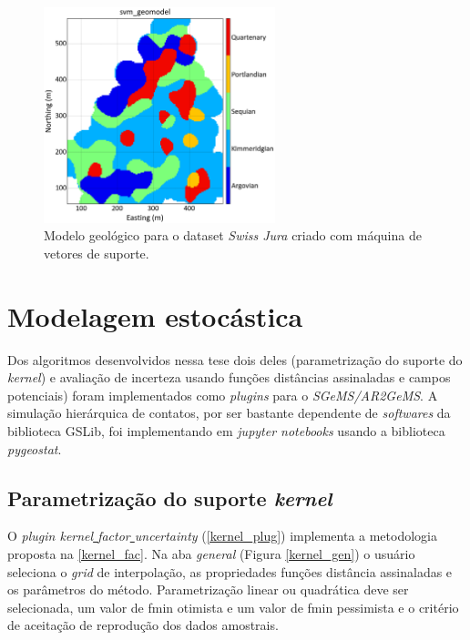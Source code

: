 \begin{figure}[H]
	\centering
	\caption{\label{jura_svm}Modelo geológico para o dataset \textit{Swiss Jura} criado com máquina de vetores de suporte.}
	\includegraphics[width=0.6\textwidth]{apendice/imagens/svmgeomodel.png}
\end{figure}

\section{Modelagem estocástica}

Dos algoritmos desenvolvidos nessa tese dois deles (parametrização do suporte do \textit{kernel}) e avaliação de incerteza usando funções distâncias assinaladas e campos potenciais) foram implementados como \textit{plugins} para o \textit{SGeMS/AR2GeMS}. A simulação hierárquica de contatos, por ser bastante dependente de \textit{softwares} da biblioteca GSLib, foi implementando em \textit{jupyter notebooks} usando a biblioteca \textit{pygeostat}.

\subsection{Parametrização do suporte \textit{kernel}}

O \textit{plugin kernel\underline{ }factor\underline{ }uncertainty} (\autoref{kernel_plug}) implementa a metodologia proposta na \autoref{kernel_fac}. Na aba \textit{general} (Figura \autoref{kernel_gen}) o usuário seleciona o \textit{grid} de interpolação, as propriedades funções distância assinaladas e os parâmetros do método. Parametrização linear ou  quadrática deve ser selecionada, um valor de fmin otimista e um valor de fmin pessimista e o critério de aceitação de reprodução dos dados amostrais.

